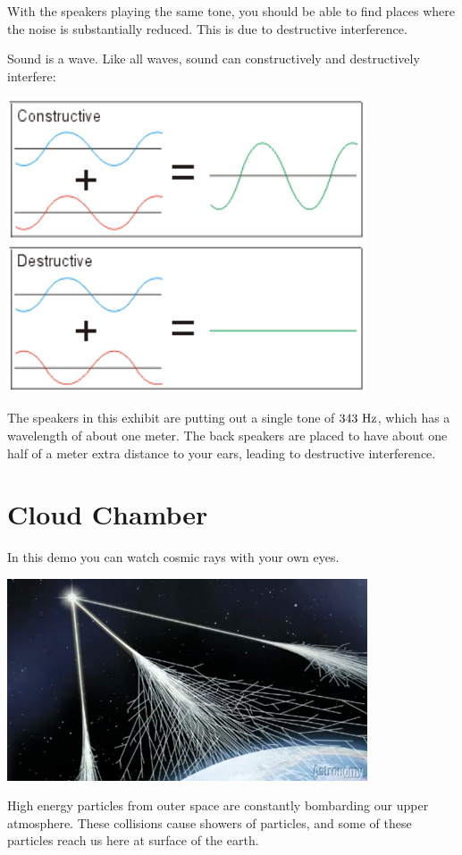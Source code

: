 \documentclass[12pt]{article}
\begin{document}
With the speakers playing the same tone, you should be able to find places where the noise is substantially reduced.   This is due to destructive interference.

Sound is a wave.  Like all waves, sound can constructively and destructively interfere:
\begin{center}
{\includegraphics[width=0.80\textwidth]{figs/interference.png}}
\end{center}

The speakers in this exhibit are putting out a single tone of $343~\rm Hz$, which has a wavelength of about one meter.  The back speakers are placed to have about one half of a meter extra distance to your ears, leading to destructive interference.

\newpage

\section{Cloud Chamber}

In this demo you can watch cosmic rays with your own eyes.
\begin{center}
{\includegraphics[width=0.80\textwidth]{figs/cosmicrays.png}}
\end{center}
High energy particles from outer space are constantly bombarding our upper atmosphere.  These collisions cause showers of particles, and some of these particles reach us here at surface of the earth.  
\end{document}
